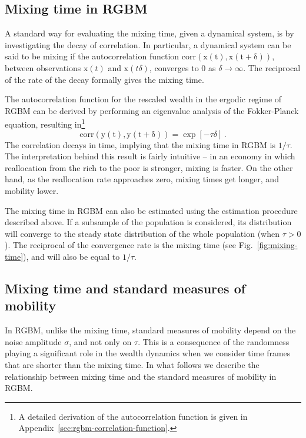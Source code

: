 \documentclass[11pt]{article}
\newcommand{\fref}[1]{Fig.~\ref{fig:#1}}
\newcommand{\be}{\begin{equation}}
\newcommand{\ee}{\end{equation}}
\numberwithin{equation}{section}
\begin{document}
\subsection{Mixing time in RGBM}

A standard way for evaluating the mixing time, given a dynamical system, is by investigating the decay of correlation. In particular, a dynamical system can be said to be mixing if the autocorrelation function $\mathrm{corr(\mathrm{x}(t), \mathrm{x}(t+\delta))}$, between observations $\mathrm{x}(t)$ and $\mathrm{x}(t\delta)$, converges to $0$ as $\delta \to \infty$. The reciprocal of the rate of the decay formally gives the mixing time.

The autocorrelation function for the rescaled wealth in the ergodic regime of RGBM can be derived by performing an eigenvalue analysis of the Fokker-Planck equation, resulting in\footnote{A detailed derivation of the autocorrelation function is given in Appendix~\ref{sec:rgbm-correlation-function}.}
%
\be
\mathrm{corr(y(t), y(t+\delta))} = \exp\left[ -\tau \delta \right]\,.
\label{eq:rgbm-correlation}
\ee
%
The correlation decays in time, implying that the mixing time in RGBM is $1/\tau$. The interpretation behind this result is fairly intuitive -- in an economy in which reallocation from the rich to the poor is stronger, mixing is faster. On the other hand, as the reallocation rate approaches zero, mixing times get longer, and mobility lower.

The mixing time in RGBM can also be estimated using the estimation procedure described above. If a subsample of the population is considered, its distribution will converge to the steady state distribution of the whole population (when $\tau > 0$). The reciprocal of the convergence rate is the mixing time (see \fref{mixing-time}), and will also be equal to $1/\tau$.

\subsection{Mixing time and standard measures of mobility}\label{sec:measures}

In RGBM, unlike the mixing time, standard measures of mobility depend on the noise amplitude $\sigma$, and not only on $\tau$. This is a consequence of the randomness playing a significant role in the wealth dynamics when we consider time frames that are shorter than the mixing time. In what follows we describe the relationship between mixing time and the standard measures of mobility in RGBM.
\end{document}
